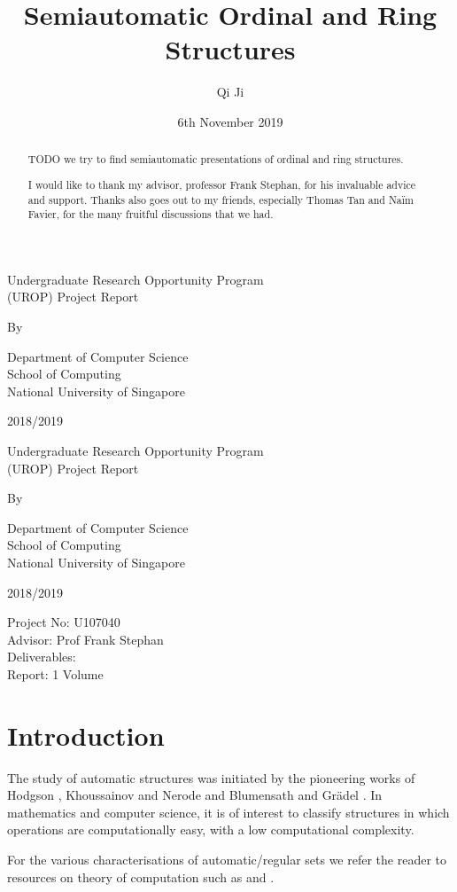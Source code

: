 \documentclass[british,a4paper,11pt,abstract=on]{scrreprt}
\title{Semiautomatic Ordinal and Ring Structures}
\author{Qi Ji}
\date{6th November 2019}
\makeatletter
\let\thetitle\@title
\let\theauthor\@author
\theoremstyle{definition}
\theoremstyle{remark}
\newcommand{\makecoverpage}{
    \begin{center}
        \singlespacing
        Undergraduate Research Opportunity Program \\
        (UROP) Project Report
        \vspace*{2cm}

        \doublespacing
        {\Large \textbf{\thetitle}}
        \vspace*{2cm}

        By \\
        \theauthor

        \vspace*{2cm}
        Department of Computer Science \\
        School of Computing \\
        National University of Singapore

        \vspace*{2cm}
        2018/2019
    \end{center}
}
\newenvironment{acknowledgements}{\renewcommand\abstractname{Acknowledgements}\begin{abstract}} {\end{abstract}}
\makeatother
\begin{document}
\let\setminus\smallsetminus
\let\epsilon\varepsilon
\begin{titlepage}
    \makecoverpage
\end{titlepage}
\begin{titlepage}
    \makecoverpage
    \vspace*{3cm}

    \noindent
    Project No: U107040 \\
    Advisor: Prof Frank Stephan \\
    Deliverables: \\
    Report: 1 Volume
\end{titlepage}

\begin{abstract}
    {\Huge TODO}
    we try to find semiautomatic presentations of ordinal and ring structures.
\end{abstract}

\begin{acknowledgements}
    I would like to thank my advisor, professor Frank Stephan, for his invaluable advice and support.
    Thanks also goes out to my friends, especially Thomas Tan and Na\"im Favier, for the many fruitful discussions that we had.
\end{acknowledgements}

\tableofcontents

\chapter{Introduction}

The study of automatic structures was initiated by the pioneering works of
Hodgson \autocite{Ho76, Ho83}, Khoussainov and Nerode \autocite{KN} and Blumensath and Grädel \autocite{BG00}.
In mathematics and computer science, it is of interest to classify structures in which operations are computationally easy, with a low computational complexity.

For the various characterisations of automatic/regular sets we refer the reader to resources on theory of computation such as
\autocite{Hopcroft} and \autocite{fullautomatatheory}.
\end{document}

